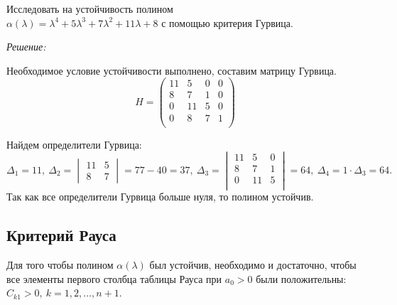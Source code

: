 \documentclass[../../TAU.tex]{subfiles}
\begin{document}
    \examp Исследовать на устойчивость полином\\
    $\alpha(\lambda) = \lambda^4+5\lambda^3+7\lambda^2+11\lambda+8$ 
    с помощью критерия Гурвица.

    {\it Решение:}\par
    Необходимое условие устойчивости выполнено, составим матрицу Гурвица.
    $$
        H = 
        \begin{pmatrix}
            11 & 5 & 0 & 0\\
            8 & 7 & 1 & 0 \\
            0 & 11 & 5 & 0\\
            0 & 8 & 7 & 1 \\
        \end{pmatrix}
    $$

    Найдем определители Гурвица: 
    $$
    \Delta_1=11,\ \Delta_2 = 
    \begin{vmatrix}
        11 & 5\\
        8  & 7
    \end{vmatrix}
    =77 - 40=37,\ \Delta_3=
    \begin{vmatrix}
        11 & 5 & 0\\
        8  & 7 & 1\\
        0 & 11 & 5\\
    \end{vmatrix}
    =64,\ \Delta_4=1 \cdot \Delta_3=64.
    $$
    Так как все определители Гурвица больше нуля, то полином устойчив. 

\subsection{Критерий Рауса}

    \theor[Рауса] Для того чтобы полином 
    $\alpha(\lambda)$ был устойчив, необходимо и достаточно, чтобы все элементы первого столбца таблицы Рауса при $a_0 > 0$ были положительны: 
    $C_{k1}>0,\ k=1, 2,..., n+1$.
\end{document}
